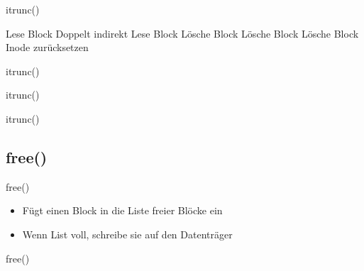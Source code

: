 \documentclass{beamer}
\begin{document}
\begin{frame}{itrunc()}
    \begin{algorithmic}[1]
         \Return \EndIf
                \State Lese Block
                        \Comment Doppelt indirekt
                        \State Lese Block
                            \State Lösche Block
                        \EndFor
                    \EndIf
                    \State Lösche Block
                \EndFor
            \EndIf
            \State Lösche Block
        \EndFor
        \State Inode zurücksetzen
    \end{algorithmic}
\end{frame}

\begin{frame}{itrunc()}
\end{frame}

\begin{frame}{itrunc()}
\end{frame}

\begin{frame}{itrunc()}
\end{frame}




\subsection{free()}

\begin{frame}{free()}
    \begin{itemize}
        \item Fügt einen Block in die Liste freier Blöcke ein
        \medskip
        \item Wenn List voll, schreibe sie auf den Datenträger
    \end{itemize}
\end{frame}

\begin{frame}{free()}
\end{frame}
\end{document}
